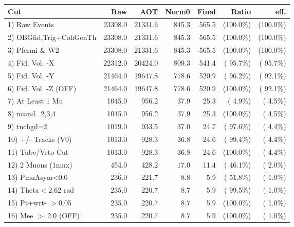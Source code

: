  \begin{table}[h!]\centering
 \begin{tabular}{||l||r|r|r|r|r|r||}
 \hline
 \hline
 Cut & Raw & AOT & Norm0 & Final & Ratio & eff.       \\
 \hline
  1) Raw Events           &      23308.0 &      21331.6 &        845.3 &        565.5 & (100.0\%) & (100.0\%) \\
  2) OBGfid,Trig+CohGenTh &      23308.0 &      21331.6 &        845.3 &        565.5 & (100.0\%) & (100.0\%) \\
  3) Pfermi \& W2         &      23308.0 &      21331.6 &        845.3 &        565.5 & (100.0\%) & (100.0\%) \\
  4) Fid. Vol. -X         &      22312.0 &      20424.0 &        809.3 &        541.4 & ( 95.7\%) & ( 95.7\%) \\
  5) Fid. Vol. -Y         &      21464.0 &      19647.8 &        778.6 &        520.9 & ( 96.2\%) & ( 92.1\%) \\
  6) Fid. Vol. -Z (OFF)   &      21464.0 &      19647.8 &        778.6 &        520.9 & (100.0\%) & ( 92.1\%) \\
  7) At Least 1 Mu        &       1045.0 &        956.2 &         37.9 &         25.3 & (  4.9\%) & (  4.5\%) \\
  8) ncand=2,3,4          &       1045.0 &        956.2 &         37.9 &         25.3 & (100.0\%) & (  4.5\%) \\
  9) tnchgd=2             &       1019.0 &        933.5 &         37.0 &         24.7 & ( 97.6\%) & (  4.4\%) \\
 10) +/- Tracks (V0)      &       1013.0 &        928.3 &         36.8 &         24.6 & ( 99.4\%) & (  4.4\%) \\
 11) Tube/Veto Cut        &       1013.0 &        928.3 &         36.8 &         24.6 & (100.0\%) & (  4.4\%) \\
 12) 2 Muons (1mux)       &        454.0 &        428.2 &         17.0 &         11.4 & ( 46.1\%) & (  2.0\%) \\
 13) PmuAsym<0.0          &        236.0 &        221.7 &          8.8 &          5.9 & ( 51.8\%) & (  1.0\%) \\
 14) Theta$<$2.62 rad     &        235.0 &        220.7 &          8.7 &          5.9 & ( 99.5\%) & (  1.0\%) \\
 15) Pt+wrt- $>$0.05      &        235.0 &        220.7 &          8.7 &          5.9 & (100.0\%) & (  1.0\%) \\
 16) Mee $>$ 2.0  (OFF)   &        235.0 &        220.7 &          8.7 &          5.9 & (100.0\%) & (  1.0\%) \\

\end{tabular}
\end{table}
